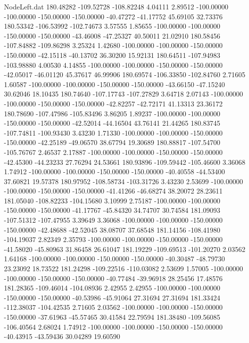 \begin{filecontents}{NodeLeft.dat}
 180.48282 -109.52728 -108.82248     4.04111    2.89512 -100.00000 -100.00000 -150.00000 -150.00000  -40.47272  -41.17752   45.69105   32.73376
 180.53342 -106.53992 -102.74673     3.57555    1.85655 -100.00000 -100.00000 -150.00000 -150.00000  -43.46008  -47.25327   40.50011   21.02910
 180.58456 -107.84882 -109.86298     3.25324    1.42680 -100.00000 -100.00000 -150.00000 -150.00000  -42.15118  -40.13702   36.30200   15.92131
 180.64511 -107.94983 -103.98880     4.00530    4.14855 -100.00000 -100.00000 -150.00000 -150.00000  -42.05017  -46.01120   45.37617   46.99906
 180.69574 -106.33850 -102.84760     2.71605    1.60587 -100.00000 -100.00000 -150.00000 -150.00000  -43.66150  -47.15240   30.62046   18.10435
 180.74640 -107.17743 -107.27829     3.64718    2.07143 -100.00000 -100.00000 -150.00000 -150.00000  -42.82257  -42.72171   41.13313   23.36172
 180.78690 -107.47986 -105.83496     3.86205    1.89237 -100.00000 -100.00000 -150.00000 -150.00000  -42.52014  -44.16504   43.76141   21.44265
 180.83745 -107.74811 -100.93430     3.43230    1.71330 -100.00000 -100.00000 -150.00000 -150.00000  -42.25189  -49.06570   38.67794   19.30689
 180.88817 -107.54700 -105.76767     2.46537    2.17887 -100.00000 -100.00000 -150.00000 -150.00000  -42.45300  -44.23233   27.76294   24.53661
 180.93896 -109.59442 -105.46600     3.36068    1.74912 -100.00000 -100.00000 -150.00000 -150.00000  -40.40558  -44.53400   37.60821   19.57378
 180.97952 -108.58734 -103.31726     3.43230    2.53699 -100.00000 -100.00000 -150.00000 -150.00000  -41.41266  -46.68274   38.20072   28.23611
 181.05040 -108.82233 -104.15680     3.10999    2.75187 -100.00000 -100.00000 -150.00000 -150.00000  -41.17767  -45.84320   34.74707   30.74584
 181.09093 -107.51312 -107.47955     3.39649    3.36068 -100.00000 -100.00000 -150.00000 -150.00000  -42.48688  -42.52045   38.08707   37.68548
 181.14156 -108.41980 -104.19037     2.82349    2.35793 -100.00000 -100.00000 -150.00000 -150.00000  -41.58020  -45.80963   31.86458   26.61047
 181.19229 -109.69513 -101.20270     2.03562    1.64168 -100.00000 -100.00000 -150.00000 -150.00000  -40.30487  -48.79730   23.23092   18.73522
 181.24298 -109.22516 -110.03082     2.53699    1.57005 -100.00000 -100.00000 -150.00000 -150.00000  -40.77484  -39.96918   28.25456   17.48576
 181.28365 -109.46014 -104.08936     2.42955    2.42955 -100.00000 -100.00000 -150.00000 -150.00000  -40.53986  -45.91064   27.31694   27.31694
 181.33424 -112.38037 -104.42535     2.71605    2.03562 -100.00000 -100.00000 -150.00000 -150.00000  -37.61963  -45.57465   30.41584   22.79594
 181.38480 -109.56085 -106.40564     2.68024    1.74912 -100.00000 -100.00000 -150.00000 -150.00000  -40.43915  -43.59436   30.04289   19.60590

\end{filecontents}
